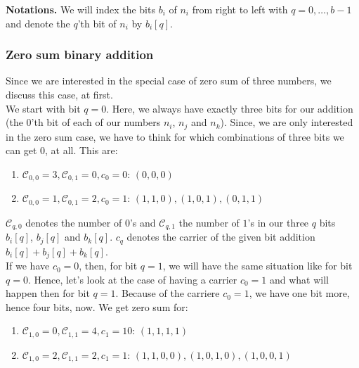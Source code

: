 \documentclass{article}
\newtheorem*{theorem A}{Theorem A}
\newtheorem*{theorem B}{N\"olker's Theorem}
\theoremstyle{remark}
\theoremstyle{remark}
\begin{document}
\textbf{Notations.} We will index the bits $b_{i}$ of $n_{i}$ from right to left with $q = 0, \dots, b - 1$ and denote the $q$'th bit of $n_{i}$ by $b_{i}[q]$.
\subsubsection{Zero sum binary addition}
\label{sss:zerosumbinaryaddition}
Since we are interested in the special case of zero sum of three numbers, we discuss this case, at first.\\

We start with bit $q=0$. Here, we always have exactly three bits for our addition (the $0$'th bit of each of our numbers $n_{i}$, $n_{j}$ and $n_{k}$). Since, we are only interested in the zero sum case, we have to think for which combinations of three bits we can get $0$, at all. This are:

\begin{enumerate}
    \item $\mathcal{C}_{0,0} = 3, \mathcal{C}_{0,1} = 0, c_{0} = 0$: $\left(0,0,0\right)$
    \item $\mathcal{C}_{0,0} = 1, \mathcal{C}_{0,1} = 2, c_{0} = 1$: $\left(1,1,0\right), \left(1,0,1\right), \left(0,1,1\right)$
\label{enum:zerosum0thbit}
\end{enumerate}

$\mathcal{C}_{q,0}$ denotes the number of $0$'s and $\mathcal{C}_{q,1}$ the number of $1$'s in our three $q$ bits $b_{i}[q]$, $b_{j}[q]$ and $b_{k}[q]$. $c_{q}$ denotes the carrier of the given bit addition $b_{i}[q] + b_{j}[q] + b_{k}[q]$.\\

If we have $c_{0} = 0$, then, for bit $q = 1$, we will have the same situation like for bit $q = 0$. Hence, let's look at the case of having a carrier $c_{0} = 1$ and what will happen then for bit $q = 1$. Because of the carriere $c_{0} = 1$, we have one bit more, hence four bits, now. We get zero sum for:

\begin{enumerate}
    \item $\mathcal{C}_{1,0} = 0, \mathcal{C}_{1,1} = 4, c_{1} = 10$: $\left(1,1,1,1\right)$
    \item $\mathcal{C}_{1,0} = 2, \mathcal{C}_{1,1} = 2, c_{1} = 1$: $\left(1,1,0,0\right), \left(1,0,1,0\right), \left(1,0,0,1\right)$
\label{enum:zerosum1thbit}
\end{enumerate}
\end{document}
